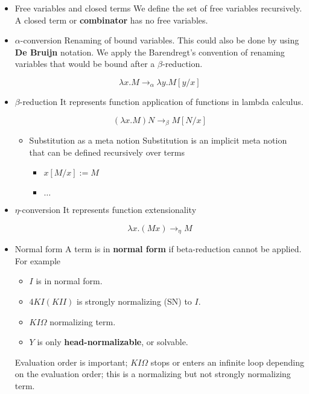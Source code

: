 \documentclass[11pt]{article}
\begin{document}
\begin{itemize}
\begin{itemize}
\item Free variables and closed terms
\label{sec-9-1-2-2-3}
We define the set of free variables recursively. A closed term or
\textbf{combinator} has no free variables.

\item $\alpha$-conversion
\label{sec-9-1-2-2-4}
Renaming of bound variables. This could also be done by using \textbf{De
Bruijn} notation. We apply the Barendregt's convention of renaming
variables that would be bound after a $\beta$-reduction.

\[
\lambda x.M \longrightarrow_{\alpha} \lambda y.M[y/x]
\]

\item $\beta$-reduction
\label{sec-9-1-2-2-5}
It represents function application of functions in lambda calculus.

\[
(\lambda x.M)N \longrightarrow_{\beta} M[N/x]
\]

\begin{itemize}
\item Substitution as a meta notion
\label{sec-9-1-2-2-5-1}
Substitution is an implicit meta notion that can be defined
recursively over terms

\begin{itemize}
\item $x[M/x] := M$
\item $\dots$
\end{itemize}
\end{itemize}

\item $\eta$-conversion
\label{sec-9-1-2-2-6}
It represents function extensionality

\[
\lambda x.(Mx) \longrightarrow_{\eta} M
\]

\item Normal form
\label{sec-9-1-2-2-7}
A term is in \textbf{normal form} if beta-reduction cannot be applied.
For example

\begin{itemize}
\item $I$ is in normal form.
\item 4$KI(KII)$ is strongly normalizing (SN) to $I$.
\item $KI\Omega$ normalizing term.
\item $Y$ is only \textbf{head-normalizable}, or solvable.
\end{itemize}

Evaluation order is important; $KI\Omega$ stops or enters an infinite loop
depending on the evaluation order; this is a normalizing but not strongly
normalizing term.


\end{itemize}
\end{itemize}
\end{document}
